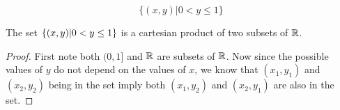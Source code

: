 \documentclass[main.tex]{subfiles}
\begin{document}
\subproblem{}\label{10b}

\[\{(x, y) | 0 < y \leq 1\}\]

\begin{thm}
	The set \(\{(x,y)|0 < y \leq 1\}\) is a cartesian product of two
	subsets of \(\mathbb{R}\).
\end{thm}
\begin{proof}
	First note both \((0,1]\) and \(\mathbb{R}\) are subsets of \(\mathbb{R}\). Now
	since the possible values of \(y\) do not depend on the values of \(x\),
	we know that \((x_1,y_1)\) and \((x_2,y_2)\) being in the set imply both
	\((x_1,y_2)\) and \((x_2,y_1)\) are also in the set.
\end{proof}
\end{document}
